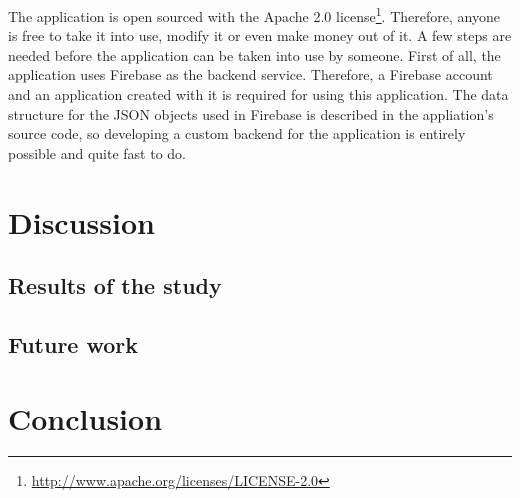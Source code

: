 The application is open sourced with the Apache 2.0 license\footnote{\url{http://www.apache.org/licenses/LICENSE-2.0}}. Therefore, anyone is free to take it into use, modify it or even make money out of it. A few steps are needed before the application can be taken into use by someone. First of all, the application uses Firebase as the backend service. Therefore, a Firebase account and an application created with it is required for using this application. The data structure for the JSON objects used in Firebase is described in the appliation's source code, so developing a custom backend for the application is entirely possible and quite fast to do.

\section{Discussion}

\subsection{Results of the study}

\subsection{Future work}

\section{Conclusion}

